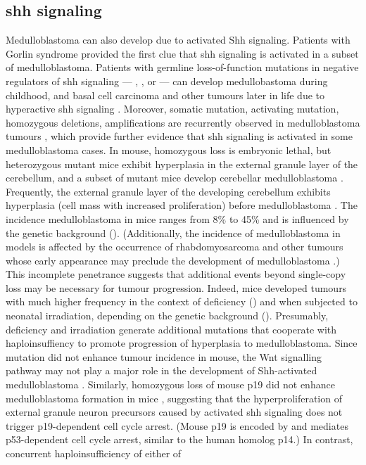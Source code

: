 \subsection{\gls{shh} signaling}

Medulloblastoma can also develop due to activated Shh signaling. Patients with Gorlin syndrome provided the first clue that \gls{shh} signaling is activated in a subset of medulloblastoma. Patients with germline loss-of-function mutations in negative regulators of \gls{shh} signaling --- , , or  --- can develop medullobastoma during childhood, and basal cell carcinoma and other tumours later in life due to hyperactive \gls{shh} signaling . Moreover, somatic  mutation, activating  mutation,  homozygous deletions,  amplifications are recurrently observed in medulloblastoma tumours , which provide further evidence that \gls{shh} signaling is activated in some medulloblastoma cases. In mouse, homozygous  loss is embryonic lethal, but heterozygous  mutant mice exhibit hyperplasia in the external granule layer of the cerebellum, and a subset of mutant mice develop cerebellar medulloblastoma . Frequently, the external granule layer of the developing cerebellum exhibits hyperplasia (cell mass with increased proliferation) before medulloblastoma . The incidence medulloblastoma in \high{+/-} mice ranges from 8\% to 45\% and is influenced by the genetic background (). (Additionally, the incidence of medulloblastoma in \high{+/-} models is affected by the occurrence of rhabdomyosarcoma and other tumours whose early appearance may preclude the development of medulloblastoma .) This incomplete penetrance suggests that additional events beyond single-copy  loss may be necessary for tumour progression. Indeed, \high{+/-} mice developed tumours with much higher frequency in the context of  deficiency () and when subjected to neonatal irradiation, depending on the genetic background (). Presumably,  deficiency and irradiation generate additional mutations that cooperate with  haploinsuffiency to promote progression of hyperplasia to medulloblastoma. Since  mutation did not enhance tumour incidence in \high{+/-} mouse, the Wnt signalling pathway may not play a major role in the development of Shh-activated medulloblastoma . Similarly, homozygous loss of mouse p19 did not enhance medulloblastoma formation in \high{+/-} mice , suggesting that the hyperproliferation of external granule neuron precursors caused by activated \gls{shh} signaling does not trigger p19-dependent cell cycle arrest. (Mouse p19 is encoded by  and mediates p53-dependent cell cycle arrest, similar to the human homolog p14.) In contrast, concurrent haploinsufficiency of either of 